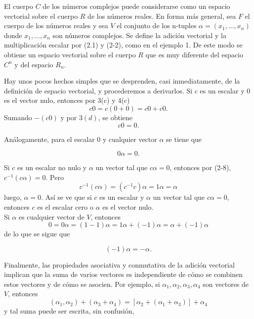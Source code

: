 \begin{ejem}
    El cuerpo $C$ de los números complejos puede considerarse como un espacio vectorial sobre el cuerpo $R$ de los números reales. En forma más general, sea $F$ el cuerpo de los números reales y sea $V$ el conjunto de los n-tuples $\alpha=(x_1,\ldots,x_n)$ donde $x_1,\ldots , x_n$ son números complejos. Se define la adición vectorial y la multiplicación escalar por (2.1) y (2-2), como en el ejemplo 1. De este modo se obtiene un espacio vectorial sobre el cuerpo $R$ que es muy diferente del espacio $C^n$ y del espacio $R_n$.
\end{ejem}

\vspace{.5cm}

Hay unos pocos hechos simples que se desprenden, casi inmediatamente, de la definición de espacio vectorial, y procederemos a derivarlos. Si $c$ es un escalar y $0$ es el vector nulo, entonces por 3(c) y 4(c)
$$c0=c(0+0)=c0+c0.$$
Sumando $-(c0)$ y por $3(d)$, se obtiene
\begin{equation}
    c0=0.
\end{equation}

Análogamente, para el escalar $0$ y cualquier vector $\alpha$ se tiene que

\begin{equation}
    0\alpha=0.
\end{equation}

Si $c$ es un escalar no nulo y $\alpha$ un vector tal que $c\alpha=0$, entonces por (2-8), $c^{-1}(c\alpha)=0.$ Pero
$$c^{-1}(c\alpha)=(c^{-1}c)\alpha=1\alpha=\alpha$$
luego, $\alpha=0$. Así se ve que si $c$ es un escalar y $\alpha$ un vector tal que $c\alpha=0$, entonces $c$ es el escalar cero o $\alpha$ es el vector nulo.\\

Si $\alpha$ es cualquier vector de $V$, entonces
$$0=0\alpha=(1-1)\alpha=1\alpha+(-1)\alpha=\alpha+(-1)\alpha$$
de lo que se sigue que

\begin{equation}
    (-1)\alpha=-\alpha.
\end{equation}

Finalmente, las propiedades asociativa y conmutativa de la adición vectorial implican que la suma de varios vectores es independiente de cómo se combinen estos vectores y de cómo se asocien. Por ejemplo, si $\alpha_1,\alpha_2,\alpha_3,\alpha_4$ son vectores de $V$, entonces
$$(\alpha_1,\alpha_2)+(\alpha_3+\alpha_4)=\left[\alpha_2+(\alpha_1+\alpha_3)\right]+\alpha_4$$
y tal suma puede ser escrita, sin confusión,

